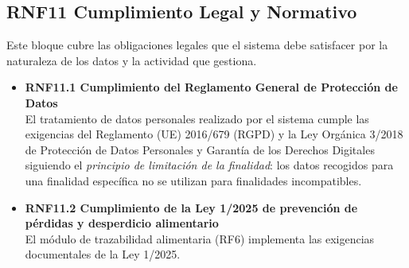 \subsection{RNF11 Cumplimiento Legal y Normativo}
Este bloque cubre las obligaciones legales que el sistema debe
satisfacer por la naturaleza de los datos y la actividad que gestiona.\
\begin{itemize}
    \item \textbf{RNF11.1 Cumplimiento del Reglamento General de Protección de Datos} \\
    El tratamiento de datos personales realizado por el sistema cumple
    las exigencias del Reglamento (UE) 2016/679 (RGPD) y la Ley
    Orgánica 3/2018 de Protección de Datos Personales y Garantía de los
    Derechos Digitales siguiendo el \textit{principio de limitación de la finalidad}: los datos recogidos para
    una finalidad específica no se utilizan para finalidades incompatibles.


    \item \textbf{RNF11.2 Cumplimiento de la Ley 1/2025 de prevención de pérdidas y desperdicio alimentario} \\
    El módulo de trazabilidad alimentaria (RF6) implementa las exigencias documentales de la Ley 1/2025.
\end{itemize}